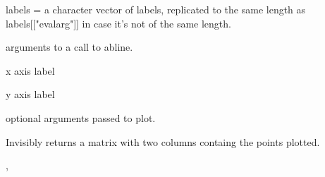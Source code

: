 \begin{Arguments}
\begin{ldescription}
labels = a character vector of labels, replicated to the same length
as labels[["evalarg"]] in case it's not of the same length.  

\item[\code{abline}] arguments to a call to abline.  

\item[\code{xlab}] x axis label 

\item[\code{ylab}] y axis label 

\item[\code{...}] optional arguments passed to plot.  

\end{ldescription}
\end{Arguments}
\begin{Value}
Invisibly returns a matrix with two columns containg the points
plotted.
\end{Value}
\begin{SeeAlso}\relax
{}, 
\end{SeeAlso}
\begin{Examples}
\end{Examples}

